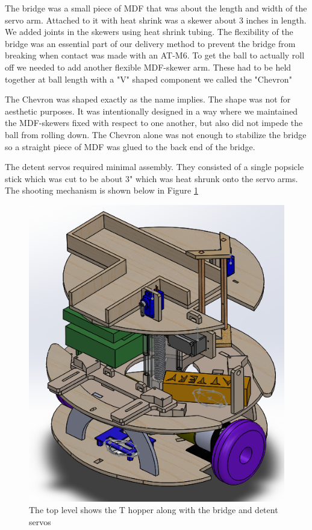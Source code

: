 \documentclass[]{article}
\begin{document}
The bridge was a small piece of MDF that was about the length and width of the servo arm. Attached to it with heat shrink was a skewer about 3 inches in length. We added joints in the skewers using heat shrink tubing. The flexibility of the bridge was an essential part of our delivery method to prevent the bridge from breaking when contact was made with an AT-M6. To get the ball to actually roll off we needed to add another flexible MDF-skewer arm. These had to be held together at ball length with a "V" shaped component we called the "Chevron"

The Chevron was shaped exactly as the name implies. The shape was not for aesthetic purposes. It was intentionally designed in a way where we maintained the MDF-skewers fixed with respect to one another, but also did not impede the ball from rolling down. The Chevron alone was not enough to stabilize the bridge so a straight piece of MDF was glued to the back end of the bridge.

The detent servos required minimal assembly. They consisted of a single popsicle stick which was cut to be about 3" which was heat shrunk onto the servo arms. The shooting mechanism is shown below in Figure \ref{Top level}

\begin{figure}[H]
    \centering
    \includegraphics[scale=0.50]{Luke-CAD.PNG}
    \caption{The top level shows the T hopper along with the bridge and detent servos}
    \label{Top level}
\end{figure}
\end{document}
